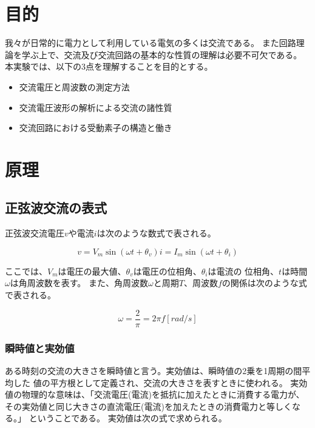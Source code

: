 \documentclass[dvipdfmx]{jsarticle}
\begin{document}
\section{目的}

我々が日常的に電力として利用している電気の多くは交流である。
また回路理論を学ぶ上で、交流及び交流回路の基本的な性質の理解は必要不可欠である。
本実験では、以下の3点を理解することを目的とする。

\begin{itemize}
\item
  交流電圧と周波数の測定方法
\item
  交流電圧波形の解析による交流の諸性質
\item
  交流回路における受動素子の構造と働き
\end{itemize}

\section{原理}

\subsection{正弦波交流の表式}

正弦波交流電圧\(v\)や電流\(i\)は次のような数式で表される。

\begin{equation}
v = V_m\sin(\omega t + \theta_v)
i = I_m\sin(\omega t + \theta_i)
\end{equation}

ここでは、\(V_m\)は電圧の最大値、\(\theta_v\)は電圧の位相角、\(\theta_i\)は電流の
位相角、\(t\)は時間\(\omega\)は角周波数を表す。
また、角周波数\(\omega\)と周期\(T\)、周波数\(f\)の関係は次のような式で表される。

\begin{equation}
\omega = \frac{2}{\pi} = 2\pi f[rad/s]
\end{equation}

\subsubsection{瞬時値と実効値}

ある時刻の交流の大きさを瞬時値と言う。実効値は、瞬時値の2乗を1周期の間平均した
値の平方根として定義され、交流の大きさを表すときに使われる。
実効値の物理的な意味は、「交流電圧(電流)を抵抗に加えたときに消費する電力が、
その実効値と同じ大きさの直流電圧(電流)を加えたときの消費電力と等しくなる。」
ということである。 実効値は次の式で求められる。
\end{document}
